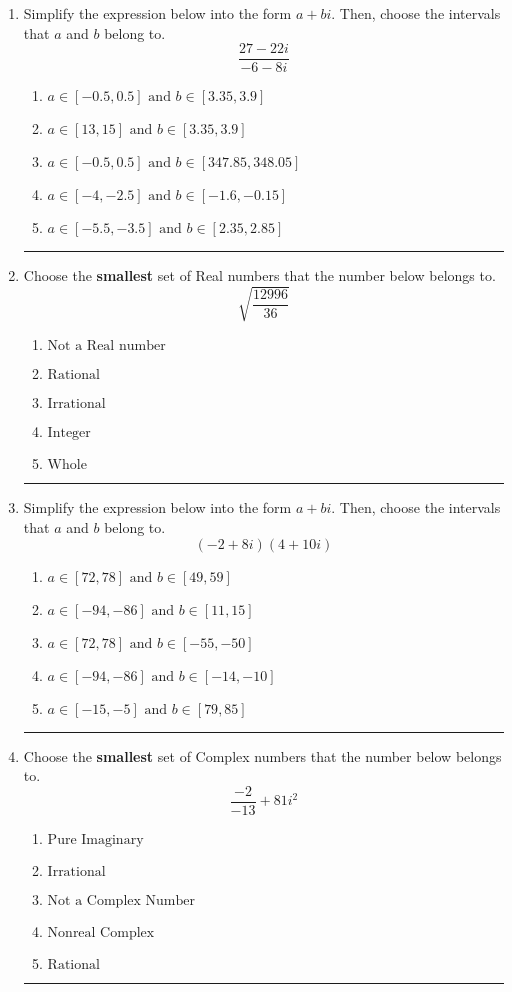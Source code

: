 \documentclass[14pt]{extbook}
\newcommand{\litem}[1]{\item#1\hspace*{-1cm}\rule{\textwidth}{0.4pt}}
\begin{document}
\begin{enumerate}
\litem{
Simplify the expression below into the form $a+bi$. Then, choose the intervals that $a$ and $b$ belong to.\[ \frac{27 - 22 i}{-6 - 8 i} \]\begin{enumerate}[label=\Alph*.]
\item \( a \in [-0.5, 0.5] \text{ and } b \in [3.35, 3.9] \)
\item \( a \in [13, 15] \text{ and } b \in [3.35, 3.9] \)
\item \( a \in [-0.5, 0.5] \text{ and } b \in [347.85, 348.05] \)
\item \( a \in [-4, -2.5] \text{ and } b \in [-1.6, -0.15] \)
\item \( a \in [-5.5, -3.5] \text{ and } b \in [2.35, 2.85] \)

\end{enumerate} }
\litem{
Choose the \textbf{smallest} set of Real numbers that the number below belongs to.\[ \sqrt{\frac{12996}{36}} \]\begin{enumerate}[label=\Alph*.]
\item \( \text{Not a Real number} \)
\item \( \text{Rational} \)
\item \( \text{Irrational} \)
\item \( \text{Integer} \)
\item \( \text{Whole} \)

\end{enumerate} }
\litem{
Simplify the expression below into the form $a+bi$. Then, choose the intervals that $a$ and $b$ belong to.\[ (-2 + 8 i)(4 + 10 i) \]\begin{enumerate}[label=\Alph*.]
\item \( a \in [72, 78] \text{ and } b \in [49, 59] \)
\item \( a \in [-94, -86] \text{ and } b \in [11, 15] \)
\item \( a \in [72, 78] \text{ and } b \in [-55, -50] \)
\item \( a \in [-94, -86] \text{ and } b \in [-14, -10] \)
\item \( a \in [-15, -5] \text{ and } b \in [79, 85] \)

\end{enumerate} }
\litem{
Choose the \textbf{smallest} set of Complex numbers that the number below belongs to.\[ \frac{-2}{-13}+81i^2 \]\begin{enumerate}[label=\Alph*.]
\item \( \text{Pure Imaginary} \)
\item \( \text{Irrational} \)
\item \( \text{Not a Complex Number} \)
\item \( \text{Nonreal Complex} \)
\item \( \text{Rational} \)


\end{enumerate}}
\end{enumerate}
\end{document}
